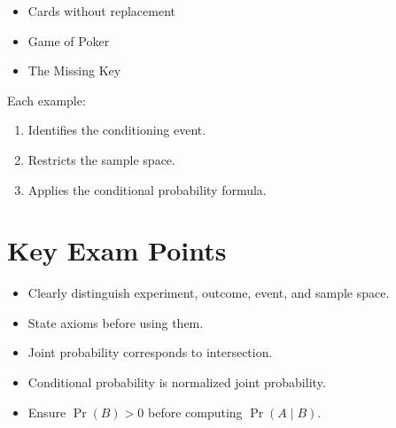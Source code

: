 \documentclass[12pt,a4paper]{article}
\begin{document}
\begin{itemize}
    \item Cards without replacement
    \item Game of Poker
    \item The Missing Key
\end{itemize}

Each example:
\begin{enumerate}
    \item Identifies the conditioning event.
    \item Restricts the sample space.
    \item Applies the conditional probability formula.
\end{enumerate}

\section{Key Exam Points}

\begin{itemize}
    \item Clearly distinguish experiment, outcome, event, and sample space.
    \item State axioms before using them.
    \item Joint probability corresponds to intersection.
    \item Conditional probability is normalized joint probability.
    \item Ensure $\Pr(B) > 0$ before computing $\Pr(A \mid B)$.
\end{itemize}
\end{document}
